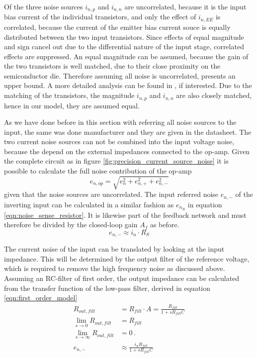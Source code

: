 Of the three noise sources $i_{n,p}$ and $i_{n,n}$ are uncorrelated, because it is the input bias current of the individual transistors, and only the effect of $i_{n,EE}$ is correlated, because the current of the emitter bias current souce is equally distributed between the two input transistors. Since effects of equal magnitude and sign cancel out due to the differential nature of the input stage, correlated effects are suppressed. An equal magnitude can be assumed, because the gain of the two transistors is well matched, due to their close proximity on the semiconductor die. Therefore assuming all noise is uncorrelated, presents an upper bound. A more detailed analysis can be found in \cite{op-amp_noise_correlation}, if interested. Due to the matching of the transistors, the magnitude $i_{n,p}$ and $i_{n,n}$ are also closely matched, hence in our model, they are assumed equal.

As we have done before in this section with referring all noise sources to the input, the same was done manufacturer and they are given in the datasheet. The two current noise sources can not be combined into the input voltage noise, because the depend on the external impedances connected to the op-amp. Given the complete circuit as in figure \ref{fig:precision_current_source_noise} it is possible to calculate the full noise contribution of the op-amp
\begin{equation}
    e_{n,op} = \sqrt{e_n^2 + e_{n,+}^2 + e_{n,-}^2}
\end{equation}
given that the noise sources are uncorrelated. The input referred noise $e_{n,-}$ of the inverting input can be calculated in a similar fashion as $e_{n_R}$ in equation \ref{eqn:noise_sense_resistor}. It is likewise part of the feedback network and must therefore be divided by the closed-loop gain $A_f$ as before.
\begin{equation}
    e_{n,-} \approx i_n \cdot R_S
\end{equation}

The current noise of the input can be translated by looking at the input impedance. This will be determined by the output filter of the reference voltage, which is required to remove the high frequency noise as discussed above. Assuming an RC-filter of first order,
the output impedance can be calculated from the transfer function of the low-pass filter, derived in equation \ref{eqn:first_order_model}
\begin{align}
    R_{out,filt} &= R_{filt} \cdot A = \frac{R_{filt}}{1+sR_{filt}C} \nonumber\\
    \lim_{s \to 0} R_{out,filt} &= R_{filt} \nonumber\\
    \lim_{s \to \infty} R_{out,filt} &= 0 \,.\nonumber\\
     e_{n,-} &\approx \frac{i_n R_{filt}}{1+sR_{filt}C}
\end{align}

